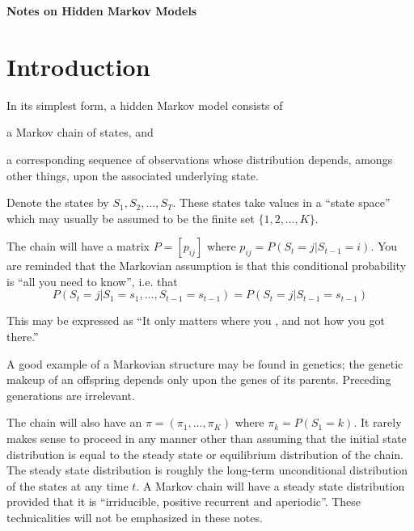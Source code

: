 
\newcommand{\Hist}{\mbox{${\cal H}$}}
\newcommand{\Fute}{\mbox{${\cal F}$}}
\newcommand{\tran}{\mbox{\scriptsize \sf T}}

\begin{centre}
{\Large \bf Notes on Hidden Markov Models}
\end{centre}
\section{Introduction}
\label{sec:intro}
In its simplest form, a hidden Markov model consists of
\begin{alist}
\item a Markov chain of  states, and
\item a corresponding sequence of observations whose distribution
depends, amongs other things, upon the associated underlying state.
\end{alist}

Denote the states by $S_1, S_2, \ldots, S_T$.  These states take
values in a ``state space'' which may usually be assumed to be
the finite set $\{1, 2, \ldots, K\}$.

The chain will have a  matrix $P =
[p_{ij}]$ where \newline $p_{ij} = P(S_t = j | S_{t-1} = i)$.  You
are reminded that the Markovian assumption is that this conditional
probability is ``all you need to know'', i.e. that
\[
P(S_t = j | S_1 = s_1, \ldots, S_{t-1} = s_{t-1}) =
                               P(S_t = j | S_{t-1} = s_{t-1})
\]

This may be expressed as ``It only matters where you , and
not how you got there.''

A good example of a Markovian structure may be found in genetics; the
genetic makeup of an offspring depends only upon the genes of its
parents.  Preceding generations are irrelevant.

The chain will also have an  $\pi = (\pi_1, \ldots, \pi_K)$ where $\pi_k = P(S_1 =
k)$.  It rarely makes sense to proceed in any manner other than
assuming that the initial state distribution is equal to the steady
state or equilibrium distribution of the chain.  The steady state
distribution is roughly the long-term unconditional distribution of
the states at any time $t$.  A Markov chain will have a steady state
distribution provided that it is ``irriducible, positive recurrent
and aperiodic''.  These technicalities will not be emphasized in
these notes.

